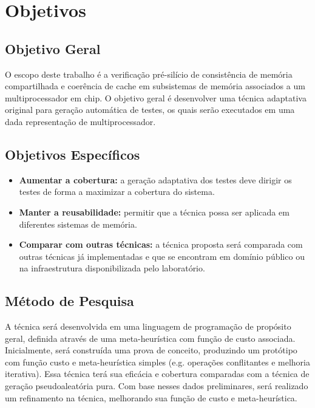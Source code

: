 \documentclass{ufsc-thesis} %
\begin{document}

\chapter{Objetivos}

\section{Objetivo Geral}
O escopo deste trabalho é a verificação pré-silício de consistência de memória compartilhada e
coerência de cache em subsistemas de memória associados a um multiprocessador em chip. O
objetivo geral é desenvolver uma técnica adaptativa original para geração automática de testes, os quais serão executados em uma dada representação de multiprocessador.

\section{Objetivos Específicos}
\begin{itemize}
    \item \textbf{Aumentar a cobertura:} a geração adaptativa dos testes deve dirigir os testes de forma a maximizar a cobertura do sistema.
    \item \textbf{Manter a reusabilidade:} permitir que a técnica possa ser aplicada em diferentes sistemas de memória.
    \item \textbf{Comparar com outras técnicas:} a técnica proposta será comparada com outras técnicas já implementadas e que se encontram em domínio público ou na infraestrutura disponibilizada pelo laboratório.
\end{itemize}

\section{Método de Pesquisa}

A técnica será desenvolvida em uma linguagem de programação de propósito geral, definida
através de uma meta-heurística com função de custo associada. Inicialmente, será construída uma
prova de conceito, produzindo um protótipo com função custo e meta-heurística simples (e.g.
operações conflitantes e melhoria iterativa). Essa técnica terá sua eficácia e cobertura
comparadas com a técnica de geração pseudoaleatória pura. Com base nesses dados preliminares,
será realizado um refinamento na técnica, melhorando sua função de custo e meta-heurística.
\end{document}
